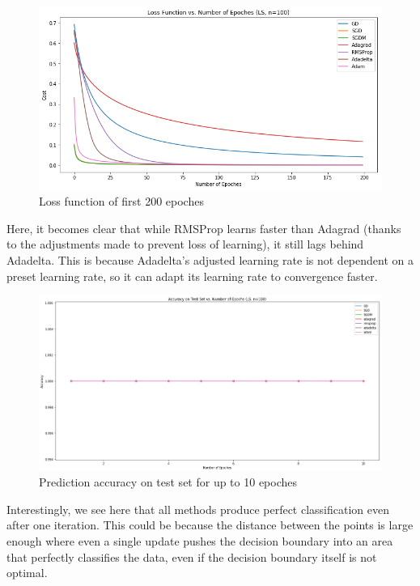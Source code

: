 \documentclass[twoside,11pt]{homework}
\begin{document}
	\begin{figure}[H]
		\centering
		\includegraphics[scale=.5]{q5/sep_100/loss_n100.png}	
		\caption{Loss function of first 200 epoches}
	\end{figure}

Here, it becomes clear that while RMSProp learns faster than Adagrad (thanks to the adjustments made to prevent loss of learning), it still lags behind Adadelta. This is because Adadelta's adjusted learning rate is not dependent on a preset learning rate, so it can adapt its learning rate to convergence faster.
	
\begin{figure}[H]
		\centering
		\includegraphics[scale=.3]{q5/sep_100/acc.png}	
		\caption{Prediction accuracy on test set for up to 10 epoches}
	\end{figure}

Interestingly, we see here that all methods produce perfect classification even after one iteration. This could be because the distance between the points is large enough where even a single update pushes the decision boundary into an area that perfectly classifies the data, even if the decision boundary itself is not optimal. 
 
\end{document}
